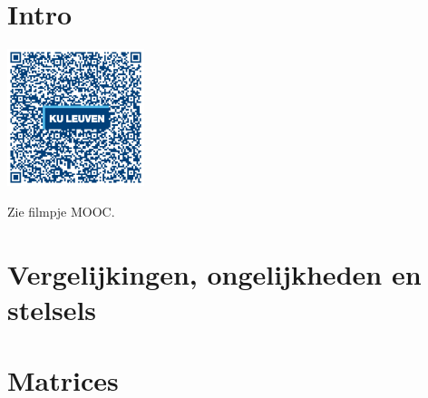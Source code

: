 
\section*{Intro}
\begin{minipage}{.25\linewidth}
	\raggedright
	\includegraphics[width=4cm]{5_vglen_ongelijkheden_stelsels_matrices/inputs/QR_Code_INTRO_module5new}
\end{minipage}
\begin{minipage}{.7\linewidth}
	Zie filmpje MOOC.
\end{minipage}

\section{Vergelijkingen, ongelijkheden en stelsels}



\pagebreak

\section{Matrices}


